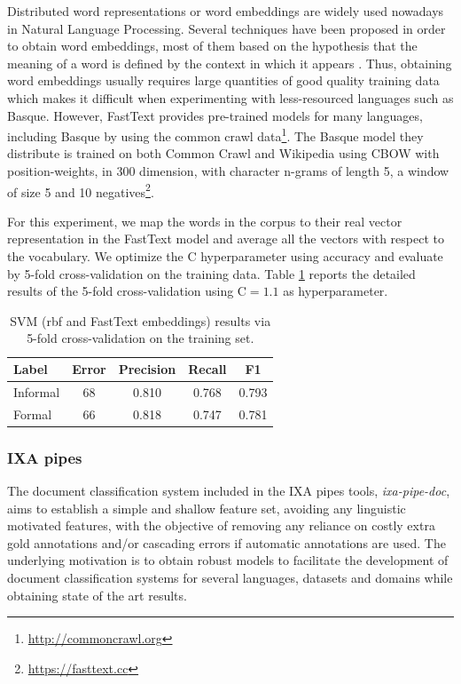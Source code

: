 \documentclass[information,article,submit,moreauthors,pdftex,10pt,a4paper]{Definitions/mdpi}
\begin{document}
Distributed word representations or word embeddings are widely used nowadays in Natural Language Processing. Several techniques have been proposed in order to obtain word embeddings, most of them based on the hypothesis that the meaning of a word is defined by the context in which it appears \cite{mikolov2013distributed,pennington-etal-2014-glove}. Thus, obtaining word embeddings usually requires large quantities of good quality training data which makes it difficult when experimenting with less-resourced languages such as Basque. However, FastText provides pre-trained models for many languages, including Basque \cite{mikolov-etal-2018-advances} by using the common crawl data\footnote{\url{http://commoncrawl.org}}. The Basque model they distribute is trained on both Common Crawl and Wikipedia using CBOW with position-weights, in 300 dimension, with character n-grams of length 5, a window of size 5 and 10 negatives\footnote{\url{https://fasttext.cc}}.

For this experiment, we map the words in the corpus to their real vector representation in the FastText model and average all the vectors with respect to the vocabulary. We optimize the C hyperparameter using accuracy and evaluate by 5-fold cross-validation on the training data. Table \ref{tab:svmf1} reports the detailed results of the 5-fold cross-validation using C$=1.1$ as hyperparameter.

\begin{table}[H]
  \centering
  \begin{tabular}{lcccc}
    \hline
    Label & Error & Precision & Recall & F1 \\ \hline \hline
    Informal & 68 & 0.810 & 0.768 & 0.793 \\
    Formal & 66 & 0.818 & 0.747 & 0.781  \\ \hline
  \end{tabular}
  \caption{SVM (rbf and FastText embeddings) results via 5-fold cross-validation on the training set.}
  \label{tab:svmf1}
\end{table}

\subsubsection{IXA pipes}\label{sec:ixa}

The document classification system included in the IXA pipes tools, \emph{ixa-pipe-doc}, aims to establish a simple and shallow feature set, avoiding any linguistic motivated features, with the objective of removing any reliance on costly extra gold annotations and/or cascading errors if automatic annotations are used. The underlying motivation is to obtain robust models to facilitate the development of document classification systems for several languages, datasets and domains while obtaining state of the art results.
\end{document}

